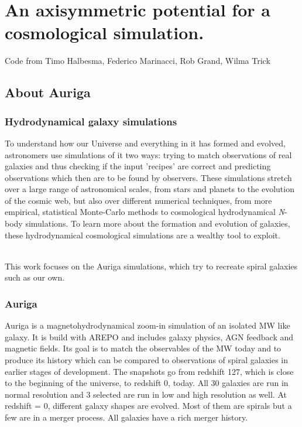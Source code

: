 \section{An axisymmetric potential for a cosmological simulation.}
Code from Timo Halbesma, Federico Marinacci, Rob Grand, Wilma Trick


\subsection{About Auriga}
\subsubsection{Hydrodynamical galaxy simulations}
To understand how our Universe and everything in it has formed and evolved, astronomers use simulations of it two ways: trying to match observations of real galaxies and thus checking if the input 'recipes' are correct and predicting observations which then are to be found by observers. These simulations stretch over a large range of astronomical scales, from stars and planets to the evolution of the cosmic web, but also over different numerical techniques, from more empirical, statistical Monte-Carlo methods to cosmological hydrodynamical \textit{N}-body simulations. To learn more about the formation and evolution of galaxies, these hydrodynamical cosmological simulations are a wealthy tool to exploit. 


\\This work focuses on the Auriga \citep{AurigaGrand} simulations, which try to recreate spiral galaxies such as our own. 

\subsubsection{Auriga}
Auriga \citep{AurigaGrand} is a magnetohydrodynamical zoom-in simulation of an isolated \ac{MW} like galaxy. It is build with AREPO \citep{AREPO} and includes galaxy physics, \ac{AGN} feedback and magnetic fields. Its goal is to match the observables of the \ac{MW} today and to produce its history which can be compared to observations of spiral galaxies in earlier stages of development. The snapshots go from redshift 127, which is close to the beginning of the universe, to redshift 0, today. All 30 galaxies are run in normal resolution and 3 selected are run in low and high resolution as well. At redshift = 0, different galaxy shapes are evolved. Most of them are spirals but a few are in a merger process. All galaxies have a rich merger history.


